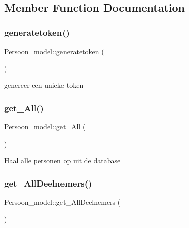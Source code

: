 \subsection{Member Function Documentation}
\mbox{\label{class_persoon__model_ae56b3007dd99ca0a98820a33228fc87a}} 
\subsubsection{\texorpdfstring{generatetoken()}{generatetoken()}}
{\footnotesize\ttfamily Persoon\+\_\+model\+::generatetoken (\begin{DoxyParamCaption}{ }\end{DoxyParamCaption})}

genereer een unieke token \mbox{\label{class_persoon__model_abf1694b8c451d02fb36b9fe6d6f54245}} 
\subsubsection{\texorpdfstring{get\+\_\+\+All()}{get\_All()}}
{\footnotesize\ttfamily Persoon\+\_\+model\+::get\+\_\+\+All (\begin{DoxyParamCaption}{ }\end{DoxyParamCaption})}

Haal alle personen op uit de database \mbox{\label{class_persoon__model_af681009d10a4938d8df855aaadff3f8c}} 
\subsubsection{\texorpdfstring{get\+\_\+\+All\+Deelnemers()}{get\_AllDeelnemers()}}
{\footnotesize\ttfamily Persoon\+\_\+model\+::get\+\_\+\+All\+Deelnemers (\begin{DoxyParamCaption}{ }\end{DoxyParamCaption})}

